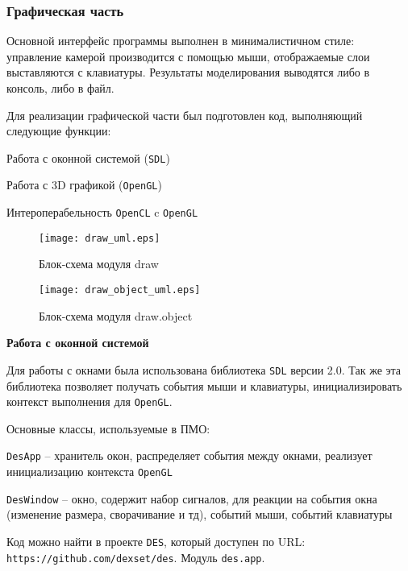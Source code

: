 \newpage
\subsubsection{Графическая часть}

Основной интерфейс программы выполнен в минималистичном стиле:
управление камерой производится с помощью мыши, отображаемые слои выставляются с клавиатуры.
Результаты моделирования выводятся либо в консоль, либо в файл.

Для реализации графической части был подготовлен код,
выполняющий следующие функции:

\begin{mintemize}
\item Работа с оконной системой (\verb|SDL|)
\item Работа с 3D графикой (\verb|OpenGL|)
\item Интероперабельность \verb|OpenCL| c \verb|OpenGL|
\end{mintemize}

\begin{figure}[h!]
    \centering
    \texttt{[image: draw\_uml.eps]}
    \caption{Блок-схема модуля draw}
\end{figure}

\begin{figure}[h!]
    \centering
    \texttt{[image: draw\_object\_uml.eps]}
    \caption{Блок-схема модуля draw.object}
\end{figure}

\newpage
\textbf{Работа с оконной системой}

Для работы с окнами была использована библиотека \verb|SDL| версии 2.0.
Так же эта библиотека позволяет получать события мыши и клавиатуры,
инициализировать контекст выполнения для \verb|OpenGL|.

Основные классы, используемые в ПМО:
\begin{mintemize}
\item \verb|DesApp| -- хранитель окон, распределяет события между окнами, реализует
    инициализацию контекста \verb|OpenGL|
\item \verb|DesWindow| -- окно, содержит набор сигналов, для реакции на события окна
    (изменение размера, сворачивание и тд), событий мыши, событий клавиатуры
\end{mintemize}

Код можно найти в проекте \verb|DES|, который доступен по
\linebreak URL: \verb|https://github.com/dexset/des|.
Модуль \verb|des.app|.

